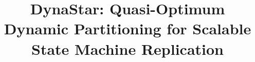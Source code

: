 \documentclass[conference]{IEEEtran}
\newcommand{\dynastar}{\mbox{DynaStar}\xspace}
\begin{document}
\title{\dynastar: Quasi-Optimum Dynamic Partitioning for Scalable State Machine Replication}


\maketitle
\thispagestyle{plain}
\pagestyle{plain}



\clearpage








%



%


\newpage
\end{document}
